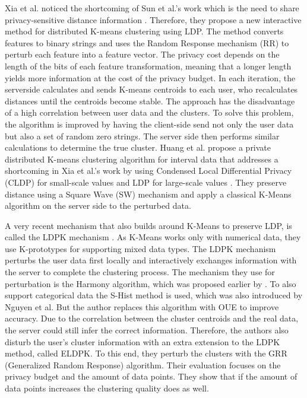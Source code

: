 Xia et al. noticed the shortcoming of Sun et al.'s work which is the need to share privacy-sensitive distance information \citep{xia_distributed_2020-1}.
Therefore, they propose a new interactive method for distributed K-means clustering using LDP.
The method converts features to binary strings and uses the Random Response mechanism (RR) to perturb each feature into a feature vector.
The privacy cost depends on the length of the bits of each feature transformation, meaning that a longer length yields more information at the cost of the privacy budget.
In each iteration, the serverside calculates and sends K-means centroids to each user, who recalculates distances until the centroids become stable.
The approach has the disadvantage of a high correlation between user data and the clusters.
To solve this problem, the algorithm is improved by having the client-side send not only the user data but also a set of random zero strings.
The server side then performs similar calculations to determine the true cluster.
Huang et al. propose a private distributed K-means clustering algorithm for interval data that addresses a shortcoming in Xia et al.'s work by using Condensed Local Differential Privacy (CLDP) for small-scale values and LDP for large-scale values \citep{9679364}.
They preserve distance using a Square Wave (SW) mechanism and apply a classical K-Means algorithm on the server side to the perturbed data.

A very recent mechanism that also builds around K-Means to preserve LDP, is called the LDPK mechanism \citep{yuan_privacypreserving_2021}.
As K-Means works only with numerical data, they use K-prototypes for supporting mixed data types.
The LDPK mechanism perturbs the user data first locally and interactively exchanges information with the server to complete the clustering process.
The mechanism they use for perturbation is the Harmony algorithm, which was proposed earlier by \citep{nguyen_collecting_2016}.
To also support categorical data the S-Hist method is used, which was also introduced by Nguyen et al.
But the author replaces this algorithm with OUE \citep{wang_locally_nodate} to improve accuracy.
Due to the correlation between the cluster centroids and the real data, the server could still infer the correct information.
Therefore, the authors also disturb the user’s cluster information with an extra extension to the LDPK method, called ELDPK.
To this end, they perturb the clusters with the GRR (Generalized Random Response) algorithm.
Their evaluation focuses on the privacy budget and the amount of data points.
They show that if the amount of data points increases the clustering quality does as well. \newline

